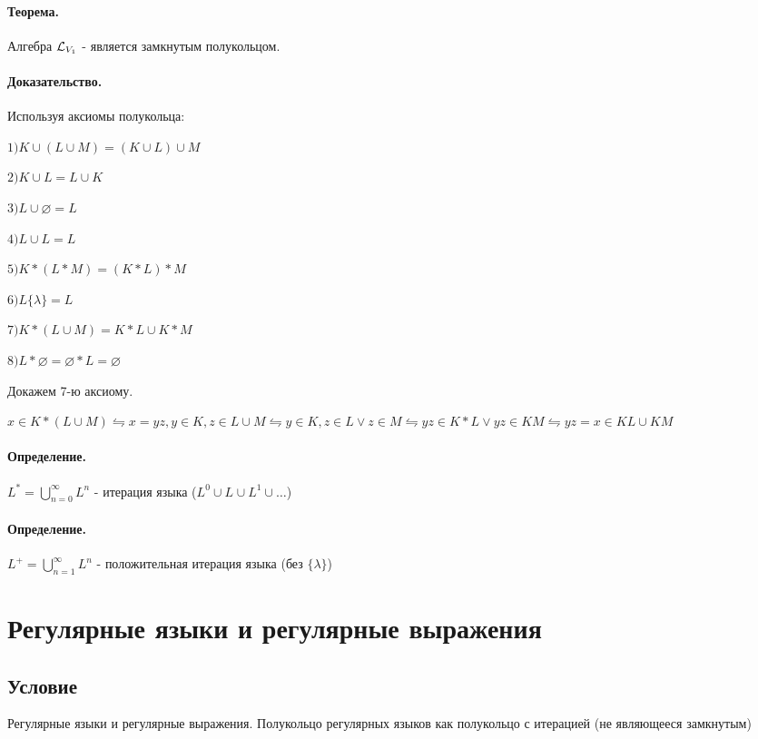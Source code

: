\documentclass{report}
\begin{document}
\paragraph*{Теорема.}
Алгебра $ {\cal L}_{V_1}$ - является замкнутым полукольцом.
\paragraph*{Доказательство.}
Используя аксиомы полукольца:

$1) K \cup (L \cup M) = (K \cup L) \cup M$

 $2) K\cup L = L \cup K$

  $3) L \cup \varnothing = L$

 $4) L \cup L = L$

  $5) K*(L*M) = (K*L)*M$

   $6) L \{\lambda\} = L$ 

   $7) K*(L \cup M) = K*L \cup K*M$

   $8) L * \varnothing = \varnothing * L = \varnothing$
 
Докажем 7-ю аксиому.

$x \in K*(L \cup M) \leftrightharpoons x = yz, y \in K,z \in L \cup M
\leftrightharpoons y \in K, z\in L \lor z \in M \leftrightharpoons
yz \in K*L \lor yz \in KM \leftrightharpoons yz = x \in KL \cup KM$

\medskip

\paragraph*{Определение.}
$L^{*}=\bigcup_{n=0}^{\infty}L^{n} $ - итерация языка ($L^{0} \cup L^{} \cup L^{1} \cup \ldots $)

\paragraph*{Определение.}
$L^{+}=\bigcup_{n=1}^{\infty}L^{n} $ - положительная итерация языка (без $\{\lambda\} $)

\newpage

\section{Регулярные языки и регулярные выражения}
\subsection{Условие}
 Регулярные языки и регулярные выражения. Полукольцо регулярных языков как
полукольцо с итерацией (не являющееся замкнутым)
\end{document}
